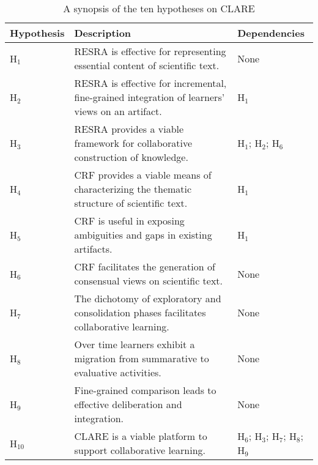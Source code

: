 \small
\begin{table}[hbt]
    \caption{A synopsis of the ten hypotheses on CLARE}
    \begin{center}
    \begin{tabular} {||l|p{3.3in}|p{1.0in}||} \hline   
      {\bf Hypothesis} & {\bf Description} & {\bf Dependencies} \\ \hline
      
      H\(_1\) & RESRA is effective for representing essential
      content of scientific text. & None \\ \hline
      
      H\(_2\) & RESRA is effective for incremental, fine-grained
      integration of learners' views on an artifact. &
      H\(_1\)\\ \hline
      
      H\(_3\) & RESRA provides a viable framework for
      collaborative construction of knowledge. & H\(_1\);
      H\(_2\); H\(_6\) \\ \hline
      
      H\(_4\) & CRF provides a viable means of characterizing the
      thematic structure of scientific text. & H\(_1\) \\ \hline
      
      H\(_5\) & CRF is useful in exposing ambiguities and gaps in
      existing artifacts. & H\(_1\) \\ \hline
      
      H\(_6\) & CRF facilitates the generation of consensual views on
      scientific text. & None \\ \hline
      
      H\(_7\) & The dichotomy of exploratory and consolidation phases
      facilitates collaborative learning. & None \\ \hline
      
      H\(_8\) & Over time learners exhibit a migration from
      summarative to evaluative activities. & None \\ \hline
      
      H\(_9\) & Fine-grained comparison leads to effective
      deliberation and integration. & None \\ \hline
      
      H\(_{10}\) & CLARE is a viable platform to support collaborative
      learning. & H\(_6\); H\(_3\); H\(_7\); H\(_8\); H\(_9\)
      \\ \hline
    \end{tabular}
    \end{center}
    \label{tab:hypothesis-summary}
\end{table}
\normalsize
{}


